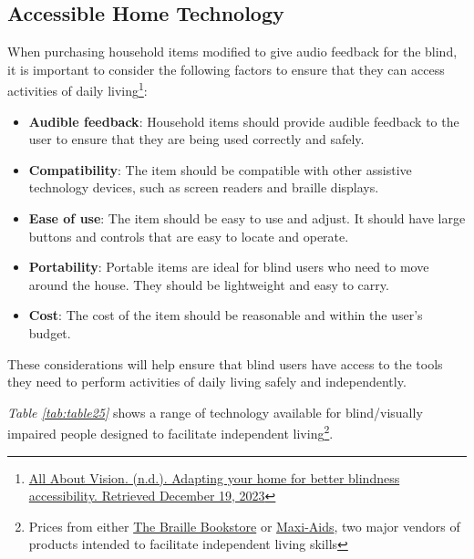\hypertarget{ind-living-tools}{}\subsection{Accessible Home Technology}\label{ind-living-tools}
When purchasing household items modified to give audio feedback for the blind, it is important to consider the following factors to ensure that they can access activities of daily living\footnote{\raggedright \href{http://www.allaboutvision.com/resources/adapting-the-home-better-blindness-accessibility/}{All About Vision. (n.d.). Adapting your home for better blindness accessibility. Retrieved December 19, 2023}}:
\begin{itemize}[leftmargin=*]
 \item \textbf{Audible feedback}: Household items should provide audible feedback to the user to ensure that they are being used correctly and safely.
 \item \textbf{Compatibility}: The item should be compatible with other assistive technology devices, such as screen readers and braille displays.
 \item \textbf{Ease of use}: The item should be easy to use and adjust. It should have large buttons and controls that are easy to locate and operate.
 \item \textbf{Portability}: Portable items are ideal for blind users who need to move around the house. They should be lightweight and easy to carry.
 \item \textbf{Cost}: The cost of the item should be reasonable and within the user’s budget.
\end{itemize}
These considerations will help ensure that blind users have access to the tools they need to perform activities of daily living safely and independently.

\textit{Table \ref{tab:table25}} shows a range of technology available for blind/visually impaired people designed to facilitate independent living\footnote{\raggedright Prices from either \href{http://www.braillebookstore.com/}{The Braille Bookstore} or \href{http://www.maxiaids.com/}{Maxi-Aids}, two major vendors of products intended to facilitate independent living skills}.


